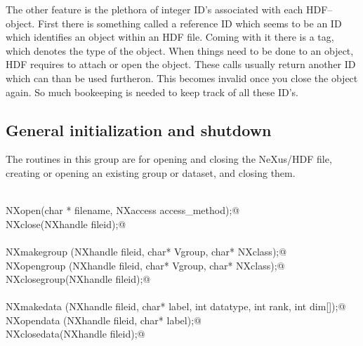 \documentclass[12pt]{article}
\begin{document}
The other feature is the plethora of integer ID's associated with each
HDF--object. First there is something called a reference ID which seems to
be an ID which identifies an object within an HDF file. Coming with it there
is a tag, which denotes the type of the object. When things need to be done
to an object, HDF requires to attach or open the object. These calls usually
return another ID which can than be used furtheron. This becomes invalid
once you close the object again. So much bookeeping is needed to keep track
of all these ID's. \label{ididid}



\subsection{General initialization and shutdown}
\label{ss:gen}


The routines in this group are for opening and closing the NeXus/HDF file,
creating or opening an existing group or dataset,  and closing them.

\begin{flushleft} \small
\begin{minipage}{\linewidth} \label{scrap3}
\vspace{-1ex}
\begin{list}{}{} \item
\mbox{}\verb@@\\
\mbox{}\verb@NXhandle  NXopen(char * filename, NXaccess access_method);@\\
\mbox{}\verb@NXstatus  NXclose(NXhandle fileid);@\\
\mbox{}\verb@@\\
\mbox{}\verb@NXstatus  NXmakegroup (NXhandle fileid, char* Vgroup, char* NXclass);@\\
\mbox{}\verb@NXstatus  NXopengroup (NXhandle fileid, char* Vgroup, char* NXclass);@\\
\mbox{}\verb@NXstatus  NXclosegroup(NXhandle fileid);@\\
\mbox{}\verb@@\\
\mbox{}\verb@NXstatus  NXmakedata (NXhandle fileid, char* label, int datatype, int rank, int dim[]);@\\
\mbox{}\verb@NXstatus  NXopendata (NXhandle fileid, char* label);@\\
\mbox{}\verb@NXstatus  NXclosedata(NXhandle fileid);@\\
\end{list}
\vspace{-1ex}
\footnotesize\addtolength{\baselineskip}{-1ex}
\end{minipage}\\[4ex]
\end{flushleft}
\end{document}
